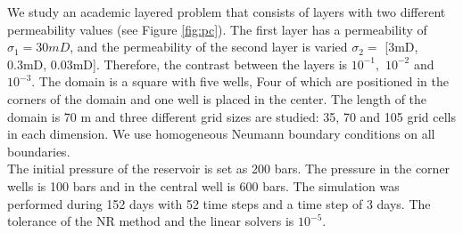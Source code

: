\documentclass[12pt]{article}
\numberwithin{equation}{section}
\begin{document}
We study an academic layered problem that consists of layers with two different permeability values (see Figure \ref{fig:pc}). The first layer has a permeability of $\sigma_1 = 30mD$, and the permeability of the second layer is varied $\sigma_2 =$ [3mD, 0.3mD, 0.03mD]. Therefore, the contrast between the layers is $10^{-1},$ $10^{-2}$ and $10^{-3}$.
The domain is a square with five wells, Four of which are positioned in the corners of the domain and one well is placed in the center. The length of the domain is 70 m and three different grid sizes are studied: 35, 70 and 105 grid cells in each dimension.  We use homogeneous Neumann boundary conditions on all boundaries. \\
The initial pressure of the reservoir is set as 200 bars. The pressure in the corner wells is 100 bars and in the central well is 600 bars.  
The simulation was performed during 152 days with 52 time steps and a time step of 3 days. The tolerance of the NR method and the linear solvers is $10^{-5}$.\\
\end{document}
